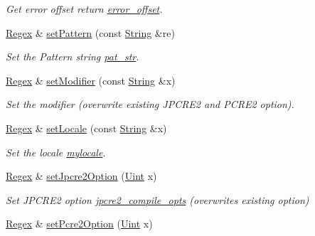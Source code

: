 \begin{DoxyCompactItemize}
\begin{DoxyCompactList}\small\item\em Get error offset return \hyperlink{classjpcre2_1_1Regex_a0b9613704582b9c6b0175a21a2a421e0}{error\+\_\+offset}. \end{DoxyCompactList}\item 
\hyperlink{classjpcre2_1_1Regex}{Regex} \& \hyperlink{classjpcre2_1_1Regex_a85d9a514ea86ae68533223adac6c6bd8}{set\+Pattern} (const \hyperlink{namespacejpcre2_a91f03070152fb228bc116c5a737f1d16}{String} \&re)
\begin{DoxyCompactList}\small\item\em Set the Pattern string \hyperlink{classjpcre2_1_1Regex_a0bceb85b6dbba355b56b5cc312214435}{pat\+\_\+str}. \end{DoxyCompactList}\item 
\hyperlink{classjpcre2_1_1Regex}{Regex} \& \hyperlink{classjpcre2_1_1Regex_aed9865b58c60945e19f36fa310f5a595}{set\+Modifier} (const \hyperlink{namespacejpcre2_a91f03070152fb228bc116c5a737f1d16}{String} \&x)
\begin{DoxyCompactList}\small\item\em Set the modifier (overwrite existing J\+P\+C\+R\+E2 and P\+C\+R\+E2 option). \end{DoxyCompactList}\item 
\hyperlink{classjpcre2_1_1Regex}{Regex} \& \hyperlink{classjpcre2_1_1Regex_a56721534519e5cb436337043eee8f42d}{set\+Locale} (const \hyperlink{namespacejpcre2_a91f03070152fb228bc116c5a737f1d16}{String} \&x)
\begin{DoxyCompactList}\small\item\em Set the locale \hyperlink{classjpcre2_1_1Regex_a92a3ad992cade62d103248302f7e2f2d}{mylocale}. \end{DoxyCompactList}\item 
\hyperlink{classjpcre2_1_1Regex}{Regex} \& \hyperlink{classjpcre2_1_1Regex_a031617a19638ef752dcd2b29fa3464d5}{set\+Jpcre2\+Option} (\hyperlink{namespacejpcre2_a078242d38221a13fb3543b9edd78c099}{Uint} x)
\begin{DoxyCompactList}\small\item\em Set J\+P\+C\+R\+E2 option \hyperlink{classjpcre2_1_1Regex_abdd26c3bc1c3132f0aa73dde1690a7ef}{jpcre2\+\_\+compile\+\_\+opts} (overwrites existing option) \end{DoxyCompactList}\item 
\hyperlink{classjpcre2_1_1Regex}{Regex} \& \hyperlink{classjpcre2_1_1Regex_acdc6f97f4030ae109c4e1a4e2310bceb}{set\+Pcre2\+Option} (\hyperlink{namespacejpcre2_a078242d38221a13fb3543b9edd78c099}{Uint} x)

\end{DoxyCompactItemize}
